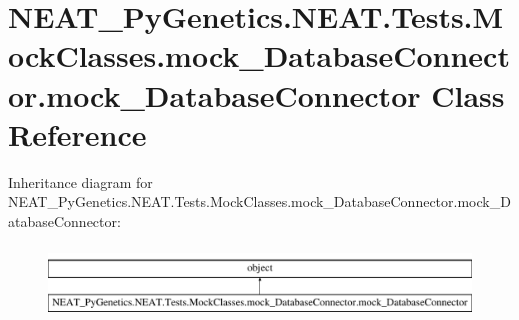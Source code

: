 \hypertarget{class_n_e_a_t___py_genetics_1_1_n_e_a_t_1_1_tests_1_1_mock_classes_1_1mock___database_connector_1_1mock___database_connector}{}\section{N\+E\+A\+T\+\_\+\+Py\+Genetics.\+N\+E\+A\+T.\+Tests.\+Mock\+Classes.\+mock\+\_\+\+Database\+Connector.\+mock\+\_\+\+Database\+Connector Class Reference}
\label{class_n_e_a_t___py_genetics_1_1_n_e_a_t_1_1_tests_1_1_mock_classes_1_1mock___database_connector_1_1mock___database_connector}
Inheritance diagram for N\+E\+A\+T\+\_\+\+Py\+Genetics.\+N\+E\+A\+T.\+Tests.\+Mock\+Classes.\+mock\+\_\+\+Database\+Connector.\+mock\+\_\+\+Database\+Connector\+:\begin{figure}[H]
\begin{center}
\leavevmode
\includegraphics[height=1.941074cm]{class_n_e_a_t___py_genetics_1_1_n_e_a_t_1_1_tests_1_1_mock_classes_1_1mock___database_connector_1_1mock___database_connector}
\end{center}
\end{figure}
